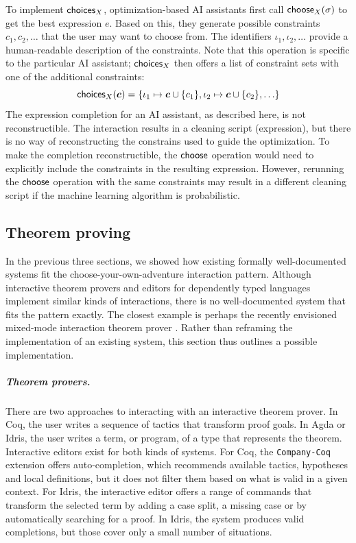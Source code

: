 \documentclass[anonymous, a4paper,UKenglish,cleveref, autoref, thm-restate]{lipics-v2021}
\newcommand{\ident}[1]{\textsf{#1}}
\newcommand{\select}{\textnormal{\ident{choose}}}
\newcommand{\choices}{\textnormal{\ident{choices}}}
\begin{document}
To implement $\choices_X$, optimization-based AI assistants first call $\select_X(\sigma)$ to
get the best expression $e$. Based on this, they generate possible constraints $c_1, c_2, \ldots$
that the user may want to choose from. The identifiers $\iota_1,\iota_2, \ldots$ provide a
human-readable description of the constraints. Note that this operation is specific to the particular
AI assistant; $\choices_X$ then offers a list of constraint sets with one of the additional constraints:
\[
\choices_X(\boldsymbol{c}) = \{\iota_1 \mapsto \boldsymbol{c}\cup\{ c_1 \}, \iota_2\mapsto\boldsymbol{c}\cup\{ c_2 \}, \ldots\}
\]
The expression completion for an AI assistant, as described here, is not reconstructible.
The inter\-action results in a cleaning script (expression), but there is no way of reconstructing
the constrains used to guide the optimization. To make the completion reconstructible, the
$\select$ operation would need to explicitly include the constraints in the resulting expression.
However, rerunning the $\select$ operation with the same constraints may result in a different
cleaning script if the machine learning algorithm is probabilistic.


\subsection{Theorem proving}
\label{sec:examples-thm}

In the previous three sections, we showed how existing formally well-documented systems fit the
choose-your-own-adventure interaction pattern. Although interactive theorem provers and editors
for dependently typed languages implement similar kinds of interactions, there is no well-documented
system that fits the pattern exactly. The closest example is perhaps the recently envisioned
mixed-mode interaction theorem prover \cite{verter-2024-mixed}. Rather than reframing the
implementation of an existing system, this section thus outlines a possible implementation.

\subparagraph{Theorem provers.}
There are two approaches to interacting with an interactive theorem prover. In Coq, the user
writes a sequence of tactics that transform proof goals. In Agda or Idris, the user writes a
term, or program, of a type that represents the theorem. Interactive editors exist for both
kinds of systems. For Coq, the \texttt{Company-Coq} \cite{pitclaudel-2016-companycoq,aspinall-2000-general}
extension offers auto-completion, which recommends available tactics, hypotheses and local
definitions, but it does not filter them based on what is valid in a given context.
For Idris, the interactive editor \cite{brady-2015-idris} offers a range of commands that
transform the selected term by adding a case split, a missing case or by automatically searching
for a proof. In Idris, the system produces valid completions, but those cover only a small number
of situations.
\end{document}
